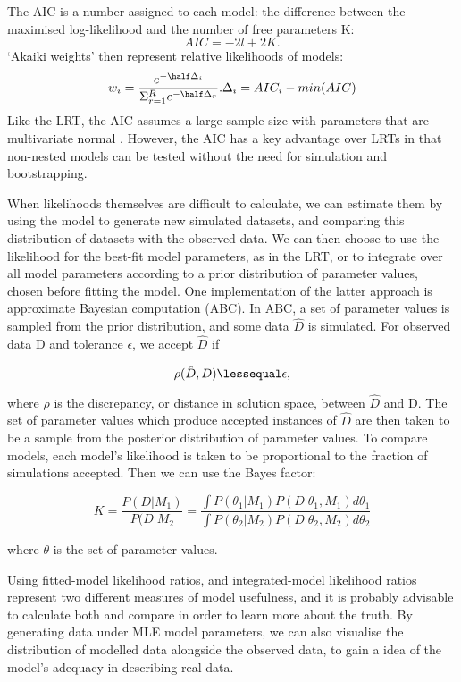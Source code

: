\documentclass[12pt]{article}
\begin{document}
The AIC is a number assigned to each model: the difference between the maximised log-likelihood and the number of free parameters K:
\begin{equation}
	AIC = -2l + 2K.
\end{equation}
`Akaiki weights' then represent relative likelihoods of models:
\begin{equation}
	w_i = \frac{e^{-\half \Delta_i}}{\Sigma^R_{r=1} e^{- \half \Delta_r}}.
	\Delta_i = AIC_i - min(AIC)
\end{equation}
Like the LRT, the AIC assumes a large sample size with parameters that are multivariate normal \citep{posada_model_2004}. However, the AIC has a key advantage over LRTs in that non-nested models can be tested without the need for simulation and bootstrapping.

When likelihoods themselves are difficult to calculate, we can estimate them by using the model to generate new simulated datasets, and comparing this distribution of datasets with the observed data. We can then choose to use the likelihood for the best-fit model parameters, as in the LRT, or to integrate over all model parameters according to a prior distribution of parameter values, chosen before fitting the model. One implementation of the latter approach is approximate Bayesian computation (ABC). In ABC, a set of parameter values is sampled from the prior distribution, and some data $\hat{D}$ is simulated. For observed data D and tolerance $\epsilon$, we accept $\hat{D}$ if

\begin{equation}
	\rho (\hat{D}, D) \lessequal \epsilon,
\end{equation}

where $\rho$ is the discrepancy, or distance in solution space, between $\hat{D}$ and D. The set of parameter values which produce accepted instances of $\hat{D}$ are then  taken to be a sample from the posterior distribution of parameter values. To compare models, each model's likelihood is taken to be proportional to the fraction of simulations accepted. Then we can use the Bayes factor:

\begin{equation}
	K = \frac{P(D|M_1)}{P(D|M_2} = \frac{\int P(\theta_1|M_1)P(D|\theta_1, M_1) d\theta_1}{\int P(\theta_2|M_2)P(D|\theta_2, M_2) d\theta_2}
\end{equation}

where $\theta$ is the set of parameter values.

Using fitted-model likelihood ratios, and integrated-model likelihood ratios represent two different measures of model usefulness, and it is probably advisable to calculate both and compare in order to learn more about the truth.
By generating data under MLE model parameters, we can also visualise the distribution of modelled data alongside the observed data, to gain a idea of the model's adequacy in describing real data. 
\end{document}
